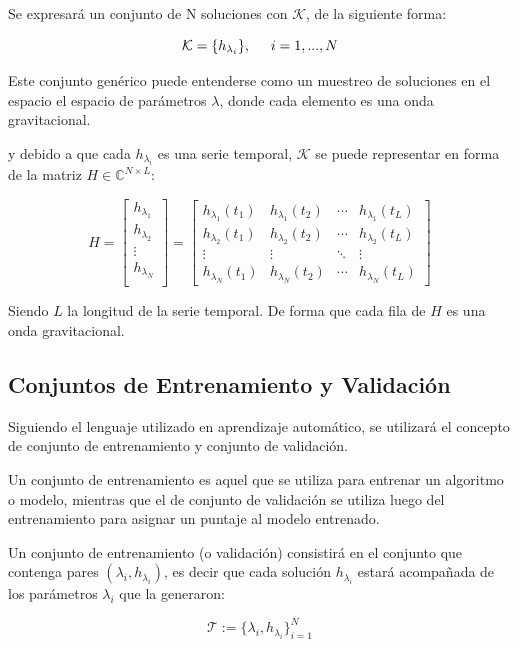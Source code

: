 Se expresará un conjunto de N soluciones con \( \mathcal{K} \), de la siguiente forma:

\[ \mathcal{K}  = \{h_{\lambda_i}\}, \hspace{5mm} i = 1, ..., N\]

Este conjunto genérico puede entenderse como un muestreo de soluciones en el espacio el espacio de parámetros $\lambda$, donde cada elemento es una onda gravitacional.

y debido a que cada $h_{\lambda_i}$ es una serie temporal, $\mathcal{K}$ se puede representar en forma de la matriz $H \in \mathbb{C}^{N\times L}$:

\[
H = 
\begin{bmatrix}
h_{\lambda_1} \\
h_{\lambda_2} \\
 \vdots \\
 h_{\lambda_N} \\
\end{bmatrix}
= 
\begin{bmatrix}
h_{\lambda_1}(t_1) & h_{\lambda_1}(t_2)  & \cdots & h_{\lambda_1}(t_L)\\
 h_{\lambda_2}(t_1) & h_{\lambda_2}(t_2)  & \cdots & h_{\lambda_2}(t_L)\\
 \vdots & \vdots & \ddots &  \vdots \\
h_{\lambda_N}(t_1) & h_{\lambda_N}(t_2)  & \cdots & h_{\lambda_N}(t_L)
\end{bmatrix}
\]

Siendo $L$ la longitud de la serie temporal. De forma que cada fila de $H$ es una onda gravitacional.

\subsection*{Conjuntos de Entrenamiento y Validación}

Siguiendo el lenguaje utilizado en aprendizaje automático, se utilizará el concepto de conjunto de entrenamiento y conjunto de validación.

Un conjunto de entrenamiento es aquel que se utiliza para entrenar un algoritmo o modelo, mientras que el de conjunto de validación se utiliza luego del entrenamiento para asignar un puntaje al modelo entrenado. 

Un conjunto de entrenamiento (o validación) consistirá en el conjunto que contenga pares $(\lambda_i, h_{\lambda_i})$, es decir que cada solución $h_{\lambda_i}$ estará acompañada de los parámetros $\lambda_i$ que la generaron:

\[
\mathcal{T} := \{ \lambda_i, h_{\lambda_i} \}_{i=1}^N
\]



